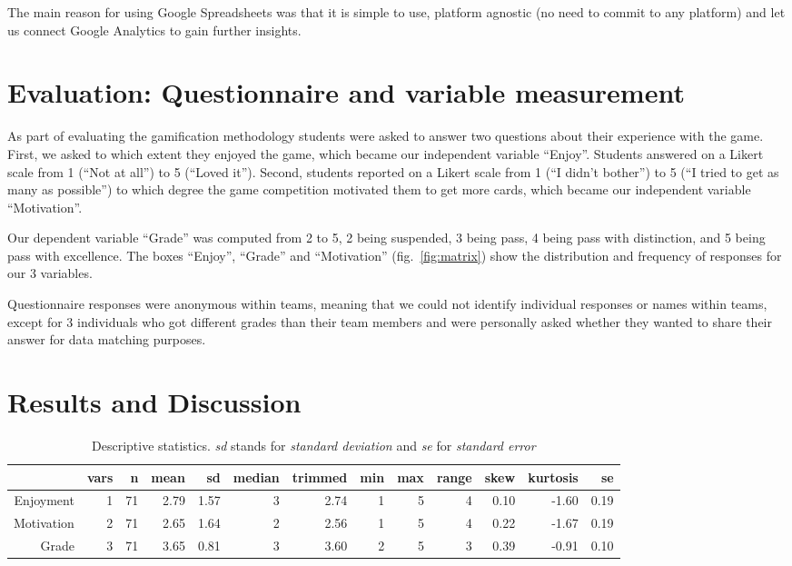 \documentclass[
]{article}
\begin{document}
The main reason for using Google Spreadsheets was that it is simple to
use, platform agnostic (no need to commit to any platform) and let us
connect Google Analytics to gain further insights.

\hypertarget{evaluation-questionnaire-and-variable-measurement}{%
\section{Evaluation: Questionnaire and variable
measurement}\label{evaluation-questionnaire-and-variable-measurement}}

As part of evaluating the gamification methodology students were asked
to answer two questions about their experience with the game. First, we
asked to which extent they enjoyed the game, which became our
independent variable ``Enjoy''. Students answered on a Likert scale from
1 (``Not at all'') to 5 (``Loved it''). Second, students reported on a
Likert scale from 1 (``I didn't bother'') to 5 (``I tried to get as many
as possible'') to which degree the game competition motivated them to
get more cards, which became our independent variable ``Motivation''.

Our dependent variable ``Grade'' was computed from 2 to 5, 2 being
suspended, 3 being pass, 4 being pass with distinction, and 5 being pass
with excellence. The boxes ``Enjoy'', ``Grade'' and ``Motivation''
(fig.~\ref{fig:matrix}) show the distribution and frequency of responses
for our 3 variables.

Questionnaire responses were anonymous within teams, meaning that we
could not identify individual responses or names within teams, except
for 3 individuals who got different grades than their team members and
were personally asked whether they wanted to share their answer for data
matching purposes.

\hypertarget{results-and-discussion}{%
\section{Results and Discussion}\label{results-and-discussion}}

\begin{table*}[t]
\centering
\begin{tabular}{|r|r|r|r|r|r|r|r|r|r|r|r|r|}
\hline
 & vars & n & mean & sd & median & trimmed & min & max & range & skew & kurtosis & se \\
\hline
Enjoyment & 1 & 71 & 2.79 & 1.57 & 3 & 2.74 & 1 & 5 & 4 & 0.10 & -1.60 & 0.19 \\
\hline
Motivation & 2 & 71 & 2.65 & 1.64 & 2 & 2.56 & 1 & 5 & 4 & 0.22 & -1.67 & 0.19 \\
\hline
Grade & 3 & 71 & 3.65 & 0.81 & 3 & 3.60 & 2 & 5 & 3 & 0.39 & -0.91 & 0.10 \\
\hline
\end{tabular}
\caption{\label{tbl:statistics}Descriptive statistics. \emph{sd} stands for \emph{standard deviation}
and \emph{se} for \emph{standard error}}
\end{table*}
\end{document}
